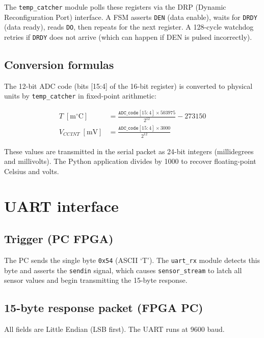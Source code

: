 \documentclass[12pt, a4paper]{report}
\begin{document}
The \texttt{temp\_catcher} module polls these registers via the DRP (Dynamic Reconfiguration
Port) interface. A FSM asserts \texttt{DEN} (data enable), waits for \texttt{DRDY}
(data ready), reads \texttt{DO}, then repeats for the next register. A 128-cycle watchdog
retries if \texttt{DRDY} does not arrive (which can happen if DEN is pulsed incorrectly).

\subsection{Conversion formulas}

The 12-bit ADC code (bits [15:4] of the 16-bit register) is converted to physical
units by \texttt{temp\_catcher} in fixed-point arithmetic:

\begin{align}
  T\;[\text{m}^\circ\text{C}] &= \frac{\texttt{ADC\_code}[15:4] \times 503975}{2^{12}} - 273150 \\
  V_{CCINT}\;[\text{mV}] &= \frac{\texttt{ADC\_code}[15:4] \times 3000}{2^{12}}
\end{align}

These values are transmitted in the serial packet as 24-bit integers (millidegrees and millivolts).
The Python application divides by 1000 to recover floating-point Celsius and volts.

\section{UART interface}

\subsection{Trigger (PC \textrightarrow{} FPGA)}

The PC sends the single byte \texttt{0x54} (ASCII `T'). The \texttt{uart\_rx} module
detects this byte and asserts the \texttt{sendin} signal, which causes \texttt{sensor\_stream}
to latch all sensor values and begin transmitting the 15-byte response.

\subsection{15-byte response packet (FPGA \textrightarrow{} PC)}

All fields are Little Endian (LSB first). The UART runs at 9600 baud.
\end{document}
